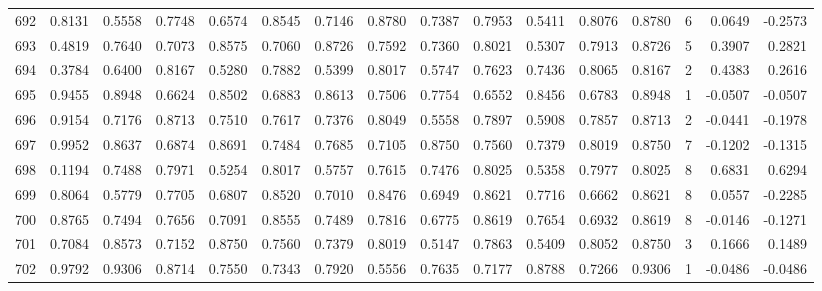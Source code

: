 \begin{tabular}{lrrrrrrrrrrrrrrr}
692 &      0.8131 &  0.5558 &  0.7748 &  0.6574 &  0.8545 &  0.7146 &  0.8780 &  0.7387 &  0.7953 &  0.5411 &   0.8076 &     0.8780 &      6 &                    0.0649 &                    -0.2573 \\
693 &      0.4819 &  0.7640 &  0.7073 &  0.8575 &  0.7060 &  0.8726 &  0.7592 &  0.7360 &  0.8021 &  0.5307 &   0.7913 &     0.8726 &      5 &                    0.3907 &                     0.2821 \\
694 &      0.3784 &  0.6400 &  0.8167 &  0.5280 &  0.7882 &  0.5399 &  0.8017 &  0.5747 &  0.7623 &  0.7436 &   0.8065 &     0.8167 &      2 &                    0.4383 &                     0.2616 \\
695 &      0.9455 &  0.8948 &  0.6624 &  0.8502 &  0.6883 &  0.8613 &  0.7506 &  0.7754 &  0.6552 &  0.8456 &   0.6783 &     0.8948 &      1 &                   -0.0507 &                    -0.0507 \\
696 &      0.9154 &  0.7176 &  0.8713 &  0.7510 &  0.7617 &  0.7376 &  0.8049 &  0.5558 &  0.7897 &  0.5908 &   0.7857 &     0.8713 &      2 &                   -0.0441 &                    -0.1978 \\
697 &      0.9952 &  0.8637 &  0.6874 &  0.8691 &  0.7484 &  0.7685 &  0.7105 &  0.8750 &  0.7560 &  0.7379 &   0.8019 &     0.8750 &      7 &                   -0.1202 &                    -0.1315 \\
698 &      0.1194 &  0.7488 &  0.7971 &  0.5254 &  0.8017 &  0.5757 &  0.7615 &  0.7476 &  0.8025 &  0.5358 &   0.7977 &     0.8025 &      8 &                    0.6831 &                     0.6294 \\
699 &      0.8064 &  0.5779 &  0.7705 &  0.6807 &  0.8520 &  0.7010 &  0.8476 &  0.6949 &  0.8621 &  0.7716 &   0.6662 &     0.8621 &      8 &                    0.0557 &                    -0.2285 \\
700 &      0.8765 &  0.7494 &  0.7656 &  0.7091 &  0.8555 &  0.7489 &  0.7816 &  0.6775 &  0.8619 &  0.7654 &   0.6932 &     0.8619 &      8 &                   -0.0146 &                    -0.1271 \\
701 &      0.7084 &  0.8573 &  0.7152 &  0.8750 &  0.7560 &  0.7379 &  0.8019 &  0.5147 &  0.7863 &  0.5409 &   0.8052 &     0.8750 &      3 &                    0.1666 &                     0.1489 \\
702 &      0.9792 &  0.9306 &  0.8714 &  0.7550 &  0.7343 &  0.7920 &  0.5556 &  0.7635 &  0.7177 &  0.8788 &   0.7266 &     0.9306 &      1 &                   -0.0486 &                    -0.0486 \\

\end{tabular}
